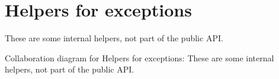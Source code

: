 \hypertarget{group__helpers}{}\section{Helpers for exceptions}
\label{group__helpers}


These are some internal helpers, not part of the public A\+PI.  


Collaboration diagram for Helpers for exceptions\+:
These are some internal helpers, not part of the public A\+PI. 

